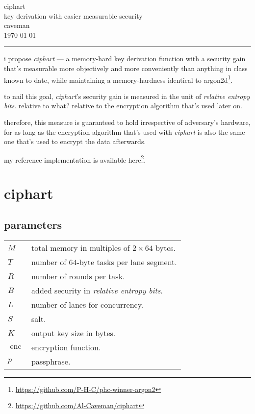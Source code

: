 \documentclass[twocolumn]{article}
\DeclareMathOperator{\enc}{enc}
\begin{document}

\begin{center}
\Huge
\noindent\xrfill[.5ex]{2pt}ciphart\xrfill[.5ex]{2pt}\\
\LARGE
key derivation with easier measurable security\\
\normalsize
caveman\\
\today\\
\rule{1\columnwidth}{2pt}
\end{center}

i propose \emph{ciphart} --- a memory-hard key derivation function with a
security gain that's measurable more objectively and more conveniently than
anything in class known to date, while maintaining a memory-hardness
identical to
argon2d\footnote{\url{https://github.com/P-H-C/phc-winner-argon2}}.

to nail this goal, \emph{ciphart}'s security gain is measured in the unit
of \emph{relative entropy bits}.  relative to what?  relative to the
encryption algorithm that's used later on.

therefore, this measure is guaranteed to hold irrespective of adversary's
hardware, for as long as the encryption algorithm that's used with
\emph{ciphart} is also the same one that's used to encrypt the data
afterwards.

my reference implementation is available
here\footnote{\url{https://github.com/Al-Caveman/ciphart}}.

\section{ciphart}
\subsection{parameters}
\begin{tabular}{ll}
    $M$ & total memory in multiples of $2 \times 64$ bytes.\\
    $T$ & number of $64$-byte tasks per lane segment.\\
    $R$ & number of rounds per task.\\
    $B$ & added security in \emph{relative entropy bits}.\\
    $L$ & number of lanes for concurrency.\\
    $S$ & salt.\\
    $K$ & output key size in bytes.\\
    $\enc$ & encryption function.\\
    $p$ & passphrase.\\
\end{tabular}
\end{document}
